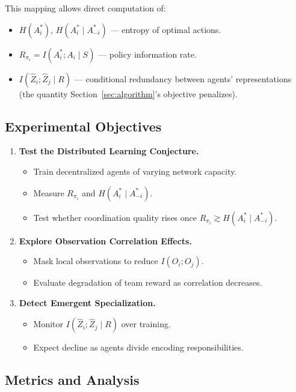 \documentclass[10pt, letterpaper]{article}
\begin{document}
This mapping allows direct computation of:
\begin{itemize}
    \item $H(A_i^*)$, $H(A_i^* \mid A_{-i}^*)$ --- entropy of optimal actions.
    \item $R_{\pi_i} = I(A_i^*; A_i \mid S)$ --- policy information rate.
    \item $I(\hat{Z}_i; \hat{Z}_j \mid R)$ --- conditional redundancy between agents' representations (the quantity Section~\ref{sec:algorithm}'s objective penalizes).
\end{itemize}

\subsection{Experimental Objectives}

\begin{enumerate}
    \item \textbf{Test the Distributed Learning Conjecture.}
    \begin{itemize}
        \item Train decentralized agents of varying network capacity.
        \item Measure $R_{\pi_i}$ and $H(A_i^* \mid A_{-i}^*)$.
        \item Test whether coordination quality rises once $R_{\pi_i} \gtrsim H(A_i^* \mid A_{-i}^*)$.
    \end{itemize}
    \item \textbf{Explore Observation Correlation Effects.}
    \begin{itemize}
        \item Mask local observations to reduce $I(O_i; O_j)$.
        \item Evaluate degradation of team reward as correlation decreases.
    \end{itemize}
    \item \textbf{Detect Emergent Specialization.}
    \begin{itemize}
        \item Monitor $I(\hat{Z}_i; \hat{Z}_j \mid R)$ over training.
        \item Expect decline as agents divide encoding responsibilities.
    \end{itemize}
\end{enumerate}

\subsection{Metrics and Analysis}
\end{document}
